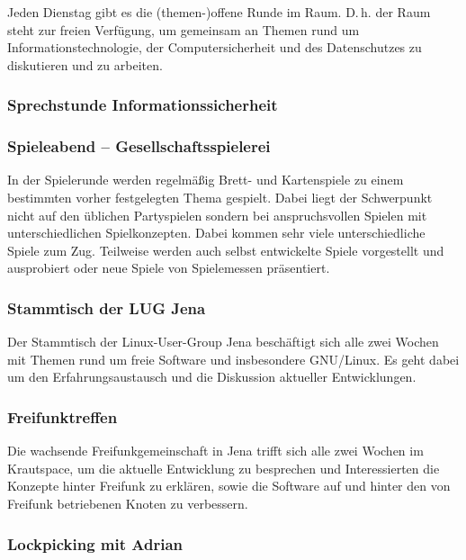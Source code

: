 \documentclass[10pt,DIV16]{scrartcl}
\begin{document}
Jeden Dienstag gibt es die (themen-)offene Runde im Raum. D.\,h. der Raum
steht zur freien Verfügung, um gemeinsam an Themen rund um
Informationstechnologie, der Computersicherheit und des
Datenschutzes zu diskutieren und zu arbeiten.

\subsubsection{Sprechstunde Informationssicherheit}


\subsubsection{Spieleabend -- Gesellschaftsspielerei}

In der Spielerunde werden regelmäßig Brett- und Kartenspiele zu einem
bestimmten vorher festgelegten Thema gespielt. Dabei liegt der Schwerpunkt
nicht auf den üblichen Partyspielen sondern bei anspruchsvollen Spielen mit
unterschiedlichen Spielkonzepten. Dabei kommen sehr viele unterschiedliche
Spiele zum Zug. Teilweise werden auch selbst entwickelte Spiele vorgestellt
und ausprobiert oder neue Spiele von Spielemessen präsentiert.

\subsubsection{Stammtisch der LUG Jena}

Der Stammtisch der Linux-User-Group Jena beschäftigt sich alle zwei Wochen
mit Themen rund um freie Software und insbesondere GNU/Linux. Es geht dabei
um den Erfahrungsaustausch und die Diskussion aktueller Entwicklungen.

\subsubsection{Freifunktreffen}

Die wachsende Freifunkgemeinschaft in Jena trifft sich alle zwei Wochen
im Krautspace, um die aktuelle Entwicklung zu besprechen und
Interessierten die Konzepte hinter Freifunk zu erklären, sowie die
Software auf und hinter den von Freifunk betriebenen Knoten zu
verbessern.

\subsubsection{Lockpicking mit Adrian}
\end{document}
